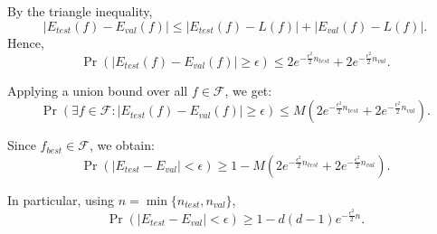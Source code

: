 \documentclass[a4paper]{article}
\begin{document}
By the triangle inequality,
\[
|E_{\mathit{test}}(f) - E_{\mathit{val}}(f)|
\le |E_{\mathit{test}}(f) - L(f)| + |E_{\mathit{val}}(f) - L(f)|.
\]
Hence,
\[
\Pr\!\left( |E_{\mathit{test}}(f) - E_{\mathit{val}}(f)| \ge \epsilon \right)
\le 2 e^{ -\frac{\epsilon^2}{2} n_{\mathit{test}} }
 + 2 e^{ -\frac{\epsilon^2}{2} n_{\mathit{val}} }.
\]

Applying a union bound over all \( f \in \mathcal{F} \), we get:
\[
\Pr\!\left( \exists f \in \mathcal{F} :
|E_{\mathit{test}}(f) - E_{\mathit{val}}(f)| \ge \epsilon \right)
\le
M \!\left(
2 e^{ -\frac{\epsilon^2}{2} n_{\mathit{test}} }
+ 2 e^{ -\frac{\epsilon^2}{2} n_{\mathit{val}} }
\right).
\]

Since \( \hat{f}_{\mathit{best}} \in \mathcal{F} \), we obtain:
\[
\Pr\!\left( |E_{\mathit{test}} - E_{\mathit{val}}| < \epsilon \right)
\ge
1 - M \!\left(
2 e^{ -\frac{\epsilon^2}{2} n_{\mathit{test}} }
+ 2 e^{ -\frac{\epsilon^2}{2} n_{\mathit{val}} }
\right)
.
\]

In particular, using \( n = \min\{ n_{\mathit{test}}, n_{\mathit{val}} \} \),
\[
\Pr\!\left( |E_{\mathit{test}} - E_{\mathit{val}}| < \epsilon \right)
\ge 1 - d(d-1) e^{ -\frac{\epsilon^2}{2} n }.
\]

\clearpage
\end{document}

